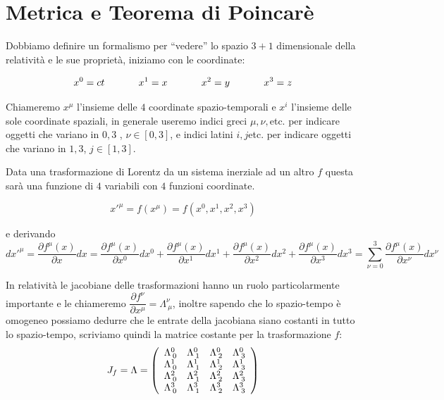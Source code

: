 \documentclass[12pt,a4paper,titlepage, twoside, openright]{book}
\numberwithin{equation}{chapter}
\begin{document}
\chapter{Metrica e Teorema di Poincarè}\label{sezOrigineFormalismo}

Dobbiamo definire un formalismo per ``vedere'' lo spazio $3+1$ dimensionale della relatività e le sue proprietà, iniziamo con le coordinate:

\[
x^0=ct \hspace{0.1\linewidth} x^1= x \hspace{0.1\linewidth} x^2=y \hspace{0.1\linewidth} x^3=z
\]

Chiameremo $x^\mu$ l'insieme delle $4$ coordinate spazio-temporali e $x^i$ l'insieme delle sole coordinate spaziali, in generale useremo indici greci $\mu,\nu,$etc. per indicare oggetti che variano in $0,3$ , $\nu\in[0,3]$, e indici latini $i,j$etc. per indicare oggetti che variano in $1,3$, $j\in[1,3]$. 

Data una trasformazione di Lorentz da un sistema inerziale ad un altro $f$ questa sarà una funzione di $4$ variabili con $4$ funzioni coordinate. 

\[
x'^\mu=f(x^\mu)=f(x^0,x^1,x^2,x^3)
\]

e derivando 
\[dx'^\mu= \dfrac{\partial f^\mu(x)}{\partial x} dx=
\dfrac{\partial f^\mu(x)}{\partial x^0} dx^0+\dfrac{\partial f^\mu(x)}{\partial x^1} dx^1+\dfrac{\partial f^\mu(x)}{\partial x^2} dx^2+\dfrac{\partial f^\mu(x)}{\partial x^3} dx^3 = \sum_{\nu=0}^{3} \dfrac{\partial f^\mu (x)}{\partial x^\nu} dx^\nu \]

In relatività le jacobiane delle trasformazioni hanno un ruolo particolarmente importante e le chiameremo $\dfrac{\partial f^\nu}{\partial x^\mu} = \Lambda^{\nu}_{\> \mu}$, inoltre sapendo che lo spazio-tempo è omogeneo possiamo dedurre che le entrate della jacobiana siano costanti in tutto lo spazio-tempo, scriviamo quindi la matrice costante per la trasformazione $f$:
\[
J_f = \Lambda = \left( \begin{array}{c c c c}
\Lambda^0_{\> 0} & \Lambda^{0}_{\> 1} & \Lambda^{0}_{\> 2} & \Lambda^{0}_{\> 3}\\
\Lambda^{1}_{\> 0} & \Lambda^{1}_{\> 1} & \Lambda^{1}_{\> 2} & \Lambda^{1}_{\> 3} \\
\Lambda^{2}_{\> 0} & \Lambda^{2}_{\> 1} & \Lambda^{2}_{\> 2} & \Lambda^{2}_{\> 3} \\
\Lambda^{3}_{\> 0} & \Lambda^{3}_{\> 1} & \Lambda^{3}_{\> 2} & \Lambda^{3}_{\> 3} \\
\end{array}\right)
\]
\end{document}
